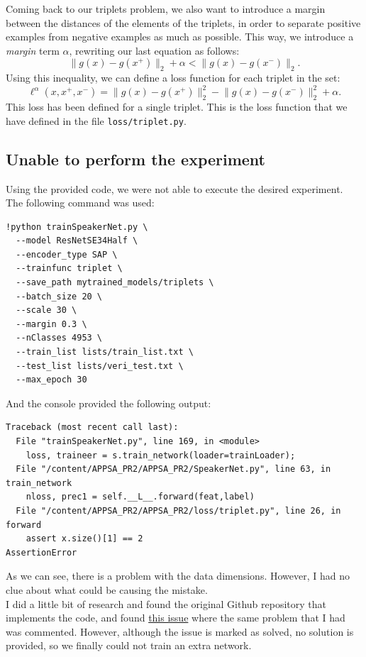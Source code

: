 \documentclass[a4paper]{article}
\newcommand{\norm}[1]{\lVert #1 \rVert}
\def\inline{\lstinline[basicstyle=\ttfamily,keywordstyle={}]}
\newcommand{\ps}{x^+}
\newcommand{\ns}{x^-}
\begin{document}
Coming back to our triplets problem, we also want to introduce a margin between the distances of the elements of the triplets, in order to separate positive examples from negative examples as much as possible. This way, we introduce a \emph{margin} term $\alpha$, rewriting our last equation as follows:
\[
\norm{g(x) - g(\ps)}_2 + \alpha < \norm{g(x) - g(\ns)}_2.
\]
Using this inequality, we can define a loss function for each triplet in the set:
\begin{equation}\label{triplet:single:loss}
\ell^\alpha (x,\ps,\ns) =  \norm{g(x) - g(\ps)}_2^2 - \norm{g(x) - g(\ns)}_2^2 + \alpha.
\end{equation}
This loss has been defined for a single triplet. This is the loss function that we have defined in the file \inline{loss/triplet.py}.
\subsection{Unable to perform the experiment}

Using the provided code, we were not able to execute the desired experiment. The following command was used:
\begin{verbatim}
!python trainSpeakerNet.py \
  --model ResNetSE34Half \
  --encoder_type SAP \
  --trainfunc triplet \
  --save_path mytrained_models/triplets \
  --batch_size 20 \
  --scale 30 \
  --margin 0.3 \
  --nClasses 4953 \
  --train_list lists/train_list.txt \
  --test_list lists/veri_test.txt \
  --max_epoch 30
\end{verbatim}

And the console provided the following output:

\begin{verbatim}
Traceback (most recent call last):
  File "trainSpeakerNet.py", line 169, in <module>
    loss, traineer = s.train_network(loader=trainLoader);
  File "/content/APPSA_PR2/APPSA_PR2/SpeakerNet.py", line 63, in train_network
    nloss, prec1 = self.__L__.forward(feat,label)
  File "/content/APPSA_PR2/APPSA_PR2/loss/triplet.py", line 26, in forward
    assert x.size()[1] == 2
AssertionError
\end{verbatim}

As we can see, there is a problem with the data dimensions. However, I had no clue about what could be causing the mistake.\\

I did a little bit of research and found the original Github repository that implements the code, and found \href{https://github.com/clovaai/voxceleb_trainer/issues/109}{this issue} where the same problem that I had was commented. However, although the issue is marked as solved, no solution is provided, so we finally could not train an extra network.
\end{document}
